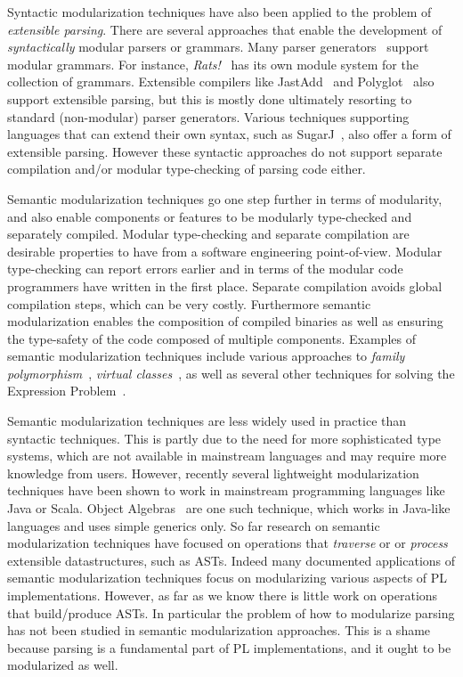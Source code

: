 Syntactic modularization techniques have also been applied to the
problem of \emph{extensible parsing}. There are several approaches
that enable the development of \emph{syntactically} modular parsers or
grammars. Many parser
generators~\cite{antlr1995,Grimm2006,Gouseti2014,Warth2016} support
modular grammars. For instance, \textit{Rats!}~\cite{Grimm2006} has
its own module system for the collection of grammars.  Extensible
compilers like JastAdd~\cite{Ekman2007} and
Polyglot~\cite{Nystrom2003} also support extensible parsing, but this
is mostly done ultimately resorting to standard (non-modular) parser
generators. Various techniques supporting languages that can extend
their own syntax, such as SugarJ~\cite{Erdweg2011}, also offer a form
of extensible parsing. However these syntactic approaches do not
support separate compilation and/or modular type-checking of parsing
code either.

Semantic modularization techniques go one step further in terms of modularity,
and also enable components or features to be modularly type-checked
and separately compiled. Modular type-checking and separate
compilation are desirable properties to have from a software
engineering point-of-view. Modular type-checking can report errors 
earlier and in terms of the modular code programmers have written 
in the first place. Separate compilation avoids global compilation
steps, which can be very costly. Furthermore semantic modularization 
enables the composition of compiled binaries as well as ensuring the 
type-safety of the code composed of multiple components. Examples of semantic modularization techniques 
include various approaches to \emph{family polymorphism}~\cite{ernst01FP},
\emph{virtual classes}~\cite{Ernst:2006}, as 
well as several other techniques for solving the Expression
Problem~\cite{Oliveira:2012}. 

Semantic modularization techniques are less widely used in practice
than syntactic techniques. This is partly due to the need for more
sophisticated type systems, which are not available in mainstream
languages and may require more knowledge from users. However, recently
several lightweight modularization techniques have been shown to work
in mainstream programming languages like Java or Scala. Object
Algebras~\cite{Oliveira:2012} are one such technique, which works in
Java-like languages and uses simple generics only. So far research on
semantic modularization techniques have focused on operations that
\emph{traverse} or or \emph{process} extensible datastructures, such
as ASTs. Indeed many documented applications of semantic
modularization techniques focus on modularizing various aspects of PL
implementations.  However, as far as we know there is little work on
operations that build/produce ASTs.  In particular the problem of how
to modularize parsing has not been studied in semantic modularization
approaches. This is a shame because parsing is a fundamental part of
PL implementations, and it ought to be modularized as well.


